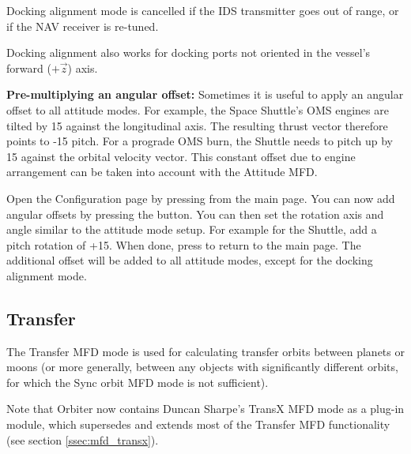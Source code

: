 \documentclass[Orbiter User Manual.tex]{subfiles}
\begin{document}
Docking alignment mode is cancelled if the IDS transmitter goes out of range, or
if the NAV receiver is re-tuned.

Docking alignment also works for docking ports not oriented in the vessel's
forward ($+\vec{z}$) axis.

\textbf{Pre-multiplying an angular offset:}
Sometimes it is useful to apply an angular offset to all attitude modes. For
example, the Space Shuttle's OMS engines are tilted by 15\deg{} against the
longitudinal axis. The resulting thrust vector therefore points to -15\deg{}
pitch. For a prograde OMS burn, the Shuttle needs to pitch up by 15\deg{}
against the orbital velocity vector. This constant offset due to engine
arrangement can be taken into account with the Attitude MFD.

Open the Configuration page by pressing  from the main page. You can
now add angular offsets by pressing the  button. You can then set
the rotation axis and angle similar to the attitude mode setup. For example for
the Shuttle, add a pitch rotation of +15\deg{}. When done, press  to
return to the main page. The additional offset will be added to all attitude
modes, except for the docking alignment mode.


\subsection{Transfer}
\label{ssec:mfd_transfer}
The Transfer MFD mode is used for calculating transfer orbits between planets or
moons (or more generally, between any objects with significantly different
orbits, for which the Sync orbit MFD mode is not sufficient).

Note that Orbiter now contains Duncan Sharpe's TransX MFD mode as a plug-in
module, which supersedes and extends most of the Transfer MFD functionality (see
section \ref{ssec:mfd_transx}).
\end{document}
